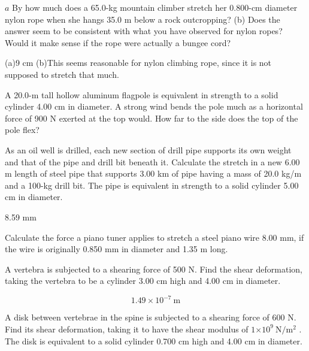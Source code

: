 \documentclass[
]{book}
\begin{document}
\hypertarget{fs-id1165298598606}{}
\leavevmode{}%
\(a\) By how much does a 65.0-kg mountain climber stretch her 0.800-cm
diameter nylon rope when she hangs 35.0 m below a rock outcropping? (b)
Does the answer seem to be consistent with what you have observed for
nylon ropes? Would it make sense if the rope were actually a bungee
cord?

\leavevmode{}%
(a)9 cm {\hfill\break
} (b)This seems reasonable for nylon climbing rope,
since it is not supposed to stretch that much.

\hypertarget{fs-id1165298937277}{}
\leavevmode{}%
A 20.0-m tall hollow aluminum flagpole is equivalent in strength to a
solid cylinder 4.00 cm in diameter. A strong wind bends the pole much as
a horizontal force of 900 N exerted at the top would. How far to the
side does the top of the pole flex?

\hypertarget{fs-id1165296239036}{}
\leavevmode{}%
As an oil well is drilled, each new section of drill pipe supports its
own weight and that of the pipe and drill bit beneath it. Calculate the
stretch in a new 6.00 m length of steel pipe that supports 3.00 km of
pipe having a mass of 20.0 kg/m and a 100-kg drill bit. The pipe is
equivalent in strength to a solid cylinder 5.00 cm in diameter.

\leavevmode{}%
8.59 mm

\hypertarget{fs-id1165298786214}{}
\leavevmode{}%
Calculate the force a piano tuner applies to stretch a steel piano wire
8.00 mm, if the wire is originally 0.850 mm in diameter and 1.35 m long.

\hypertarget{fs-id1165298982360}{}
\leavevmode{}%
A vertebra is subjected to a shearing force of 500 N. Find the shear
deformation, taking the vertebra to be a cylinder 3.00 cm high and 4.00
cm in diameter.

\hypertarget{fs-id1165298858039}{}
\leavevmode{}%
\[{1\text{.}{\text{49} \times \text{10}^{- 7}}\ \text{m}}{}\]

\hypertarget{fs-id1165298797862}{}
\leavevmode{}%
A disk between vertebrae in the spine is subjected to a shearing force
of 600 N. Find its shear deformation, taking it to have the shear
modulus of \({1{\times \text{10}^{9}}{\ \text{N}/\text{m}^{2}}}{}\) . The
disk is equivalent to a solid cylinder 0.700 cm high and 4.00 cm in
diameter.
\end{document}
